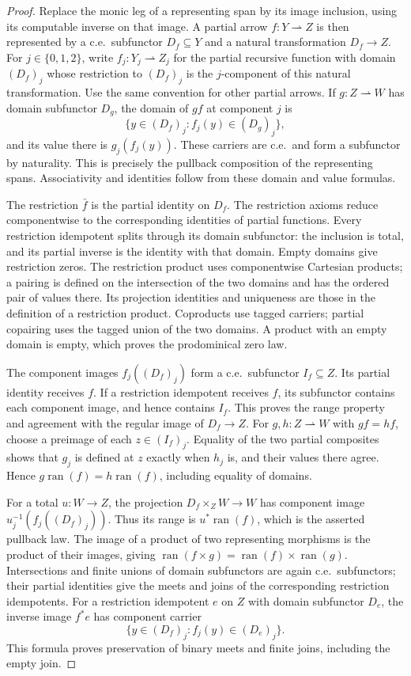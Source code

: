 \documentclass[11pt]{article}
\newcommand{\ran}{\operatorname{ran}}
\begin{document}
\begin{proof}
Replace the monic leg of a representing span by its image
inclusion, using its computable inverse on that image. A partial
arrow $f:Y\rightharpoonup Z$ is then represented by a c.e.\ subfunctor
$D_f\subseteq Y$ and a natural transformation $D_f\to Z$.
For $j\in\{0,1,2\}$, write $f_j:Y_j\rightharpoonup Z_j$ for the
partial recursive function with domain $(D_f)_j$ whose restriction
to $(D_f)_j$ is the $j$-component of this natural transformation.
Use the same convention for other partial arrows.
If $g:Z\rightharpoonup W$ has domain subfunctor $D_g$, the domain of $gf$
at component $j$ is
\[
 \{y\in(D_f)_j:f_j(y)\in(D_g)_j\},
\]
and its value there is $g_j(f_j(y))$. These carriers are c.e.\
and form a subfunctor by naturality. This is precisely the
pullback composition of the representing spans. Associativity
and identities follow from these domain and value formulas.

The restriction $\bar f$ is the partial identity on $D_f$.
The restriction axioms reduce componentwise to the corresponding
identities of partial functions. Every restriction idempotent
splits through its domain subfunctor: the inclusion is total,
and its partial inverse is the identity with that domain.
Empty domains give restriction zeros. The restriction product
uses componentwise Cartesian products; a pairing is defined on
the intersection of the two domains and has the ordered pair
of values there. Its projection identities and uniqueness are
those in the definition of a restriction product. Coproducts
use tagged carriers; partial copairing uses the tagged union
of the two domains. A product with an empty domain is empty,
which proves the prodominical zero law.

The component images $f_j((D_f)_j)$ form a c.e.\ subfunctor
$I_f\subseteq Z$. Its partial identity receives $f$. If a restriction
idempotent receives $f$, its subfunctor contains each component image,
and hence contains $I_f$.
This proves the range property and agreement with the regular
image of $D_f\to Z$. For $g,h:Z\rightharpoonup W$ with
$gf=hf$, choose a preimage of each $z\in(I_f)_j$. Equality of the two partial composites shows
that $g_j$ is defined at $z$ exactly when $h_j$ is, and their
values there agree. Hence $g\ran(f)=h\ran(f)$, including
equality of domains.

For a total $u:W\to Z$, the projection
$D_f\times_Z W\to W$ has component image
$u_j^{-1}(f_j((D_f)_j))$. Thus its range is $u^*\ran(f)$,
which is the asserted pullback law. The image of a product
of two representing morphisms is the product of their images, giving
$\ran(f\times g)=\ran(f)\times\ran(g)$.
Intersections and finite unions of domain subfunctors are again
c.e.\ subfunctors; their partial identities give the meets and joins
of the corresponding restriction idempotents. For a restriction idempotent
$e$ on $Z$ with domain subfunctor $D_e$, the inverse image $f^*e$
has component carrier
\[
 \{y\in(D_f)_j:f_j(y)\in(D_e)_j\}.
\]
This formula proves preservation of binary meets and finite joins,
including the empty join.


\end{proof}
\end{document}
